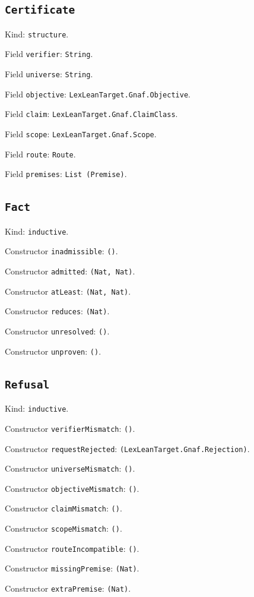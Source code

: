 \documentclass[11pt]{article}
\begin{document}
\subsection*{\texttt{Certificate}}
\noindent Kind: \texttt{structure}.\par
\noindent Field \texttt{verifier}: \texttt{String}.\par
\noindent Field \texttt{universe}: \texttt{String}.\par
\noindent Field \texttt{objective}: \texttt{LexLeanTarget.Gnaf.Objective}.\par
\noindent Field \texttt{claim}: \texttt{LexLeanTarget.Gnaf.ClaimClass}.\par
\noindent Field \texttt{scope}: \texttt{LexLeanTarget.Gnaf.Scope}.\par
\noindent Field \texttt{route}: \texttt{Route}.\par
\noindent Field \texttt{premises}: \texttt{List (Premise)}.\par
\subsection*{\texttt{Fact}}
\noindent Kind: \texttt{inductive}.\par
\noindent Constructor \texttt{inadmissible}: \texttt{()}.\par
\noindent Constructor \texttt{admitted}: \texttt{(Nat, Nat)}.\par
\noindent Constructor \texttt{atLeast}: \texttt{(Nat, Nat)}.\par
\noindent Constructor \texttt{reduces}: \texttt{(Nat)}.\par
\noindent Constructor \texttt{unresolved}: \texttt{()}.\par
\noindent Constructor \texttt{unproven}: \texttt{()}.\par
\subsection*{\texttt{Refusal}}
\noindent Kind: \texttt{inductive}.\par
\noindent Constructor \texttt{verifierMismatch}: \texttt{()}.\par
\noindent Constructor \texttt{requestRejected}: \texttt{(LexLeanTarget.Gnaf.Rejection)}.\par
\noindent Constructor \texttt{universeMismatch}: \texttt{()}.\par
\noindent Constructor \texttt{objectiveMismatch}: \texttt{()}.\par
\noindent Constructor \texttt{claimMismatch}: \texttt{()}.\par
\noindent Constructor \texttt{scopeMismatch}: \texttt{()}.\par
\noindent Constructor \texttt{routeIncompatible}: \texttt{()}.\par
\noindent Constructor \texttt{missingPremise}: \texttt{(Nat)}.\par
\noindent Constructor \texttt{extraPremise}: \texttt{(Nat)}.\par
\end{document}
